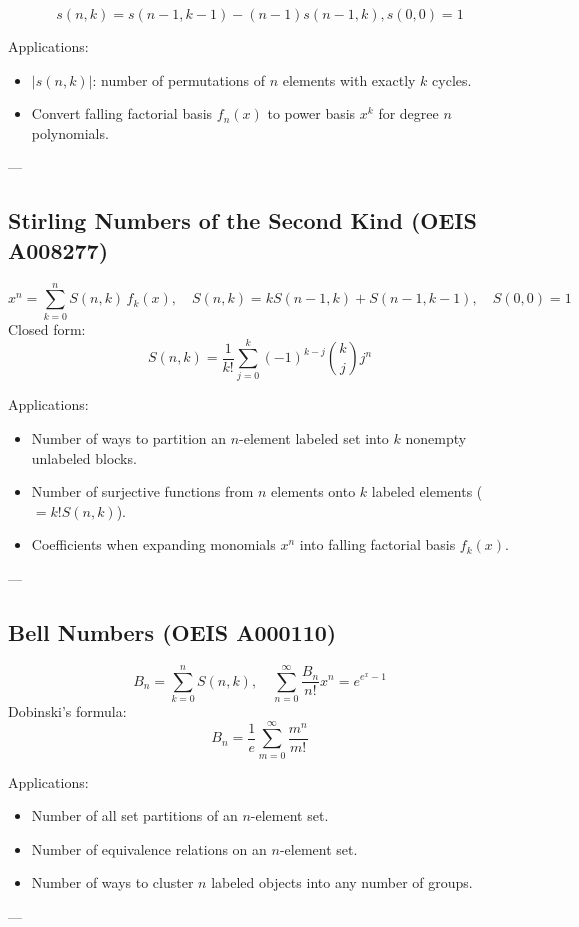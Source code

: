 $$ s(n,k) = s(n-1,k-1) - (n-1)s(n-1,k), s(0,0) = 1$$

Applications:
\begin{itemize}
  \item \(|s(n,k)|\): number of permutations of \(n\) elements with exactly \(k\) cycles.
  \item Convert falling factorial basis \(f_n(x)\) to power basis \(x^k\) for degree \(n\) polynomials.
\end{itemize}

---

\subsection*{Stirling Numbers of the Second Kind (OEIS A008277)}
\[
x^n = \sum_{k=0}^n S(n,k)\,f_k(x), \quad
S(n,k) = kS(n-1,k) + S(n-1,k-1), \quad S(0,0) = 1
\]
Closed form:
\[
S(n,k) = \frac{1}{k!} \sum_{j=0}^{k} (-1)^{k-j} \binom{k}{j} j^n
\]

Applications:
\begin{itemize}
  \item Number of ways to partition an \(n\)-element labeled set into \(k\) nonempty unlabeled blocks.
  \item Number of surjective functions from \(n\) elements onto \(k\) labeled elements (\(= k!S(n,k)\)).
  \item Coefficients when expanding monomials \(x^n\) into falling factorial basis \(f_k(x)\).
\end{itemize}

---

\subsection*{Bell Numbers (OEIS A000110)}
\[
B_n = \sum_{k=0}^n S(n,k), \quad 
\sum_{n=0}^\infty \frac{B_n}{n!} x^n = e^{e^x - 1}
\]
Dobinski’s formula:
\[
B_n = \frac{1}{e} \sum_{m=0}^{\infty} \frac{m^n}{m!}
\]

Applications:
\begin{itemize}
  \item Number of all set partitions of an \(n\)-element set.
  \item Number of equivalence relations on an \(n\)-element set.
  \item Number of ways to cluster \(n\) labeled objects into any number of groups.
\end{itemize}

---

